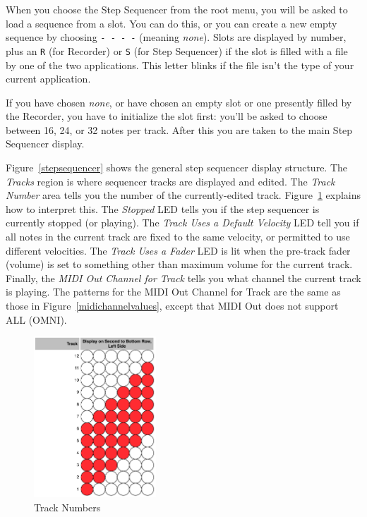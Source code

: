 \documentclass{article}
\begin{document}
When you choose the Step Sequencer from the root menu, you will be asked to load a sequence from a slot.  You can do this, or you can create a new empty sequence by choosing \texttt{-~-~-~-} (meaning {\it none}).  Slots are displayed by number, plus an \texttt{R} (for Recorder) or \texttt{S} (for Step Sequencer) if the slot is filled with a file by one of the two applications.  This letter blinks if the file isn't the type of your current application.

If you have chosen {\it none}, or have chosen an empty slot or one presently filled by the Recorder, you have to initialize the slot first: you'll be asked to choose between 16, 24, or 32 notes per track. After this you are taken to the main Step Sequencer display.  

Figure~\ref{stepsequencer} shows the general step sequencer display structure.  The {\it Tracks} region is where sequencer tracks are displayed and edited.  The {\it Track Number} area tells you the number of the currently-edited track.  Figure~\ref{tracknumber} explains how to interpret this.  The {\it Stopped} LED tells you if the step sequencer is currently stopped (or playing).  The {\it Track Uses a Default Velocity} LED tell you if all notes in the current track are fixed to the same velocity, or permitted to use different velocities.  The {\it Track Uses a Fader} LED is lit when the pre-track fader (volume) is set to something other than maximum volume for the current track.  Finally, the {\it MIDI Out Channel for Track} tells you what channel the current track is playing.  The patterns for the MIDI Out Channel for Track are the same as those in Figure~\ref{midichannelvalues}, except that MIDI Out does not support ALL (OMNI).


\begin{figure}
\includegraphics[width=1.8in]{track.pdf}
\vspace{-2em}\caption{\small Track Numbers}\vspace{-2em}
\label{tracknumber}
\end{figure}
\end{document}
